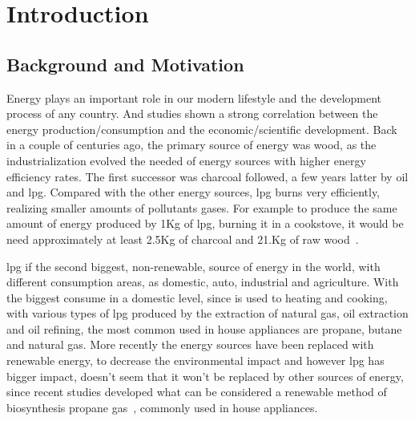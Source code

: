 \cleardoublepage
{}
\chapter{Introduction}
\section{Background and Motivation} %

Energy plays an important role in our modern lifestyle and the development process of any country. And studies shown a strong correlation between the energy production/consumption and the economic/scientific development. Back in a couple of centuries ago, the primary source of energy was wood, as the industrialization evolved the needed of energy sources with higher energy efficiency rates\cite{demirbasGlobalEnergySources2004}. The first successor was charcoal followed, a few years latter by oil and \acrshort{lpg}. Compared with the other energy sources, \acrshort{lpg} burns very efficiently, realizing smaller amounts of pollutants gases. For example to produce the same amount of energy produced by 1Kg of \acrshort{lpg}, burning it in a cookstove, it would be need approximately at least 2.5Kg of charcoal and 21.Kg of raw wood~\cite{File201403Multiple}. 

\acrshort{lpg} if the second biggest, non-renewable, source of energy in the world, with different consumption areas, as domestic, auto, industrial and agriculture. With the biggest consume in a domestic level, since is used to heating and cooking, with various types of \acrshort{lpg} produced by the extraction of natural gas, oil extraction and oil refining, the most common used in house appliances are propane, butane and natural gas\cite{LiquefiedPetroleumGas}. More recently the energy sources have been replaced with renewable energy, to decrease the environmental impact and however \acrshort{lpg} has bigger impact, doesn't seem that it won't be replaced by other sources of energy, since recent studies developed what can be considered a renewable method of biosynthesis propane gas~\cite{kallioEngineeredPathwayBiosynthesis2014b}, commonly used in house appliances.   

